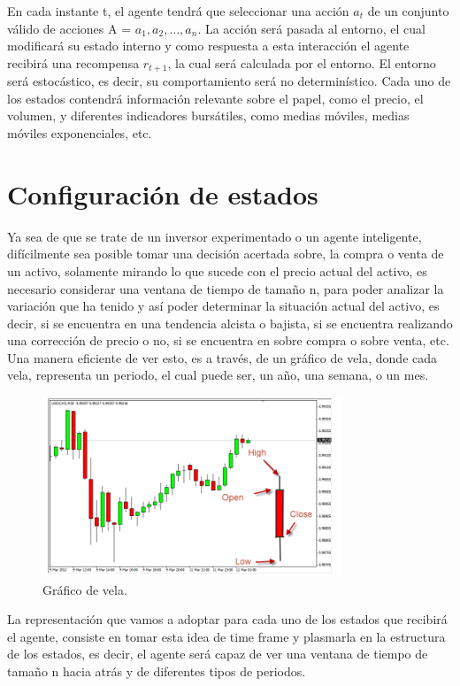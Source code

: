 En cada instante t, el agente tendrá que seleccionar una acción $a_t$  de un conjunto válido de acciones A = {$a_1, a_2, …, a_n$}. La acción será pasada al entorno, el cual modificará su estado interno y como respuesta a esta interacción el agente recibirá una recompensa $r_{t + 1}$, la cual será calculada por el entorno. El entorno será estocástico, es decir, su comportamiento será no determinístico. Cada uno de los estados contendrá información relevante sobre el papel, como el precio, el volumen, y diferentes indicadores bursátiles, como medias móviles, medias móviles exponenciales, etc.

\section{Configuración de estados}

Ya sea de que se trate de un inversor experimentado o un agente inteligente, difícilmente sea posible tomar una decisión acertada sobre, la compra o venta de un activo, solamente mirando lo que sucede con el precio actual 
del activo, es necesario considerar una ventana de tiempo de tamaño n, para poder analizar la variación que ha tenido y así poder determinar la situación actual del activo, es decir, si se encuentra en una tendencia
alcista o bajista, si se encuentra realizando una corrección de precio o no, si se encuentra en sobre compra o sobre venta, etc. Una manera eficiente de ver esto, es a través, de un gráfico de vela, donde cada vela, representa un periodo, el cual puede ser, un año, una semana, o un mes.

\begin{figure}[h!]
	\centering
	\includegraphics[scale=0.75]{imagenes/candleChart.png}
	\caption{Gráfico de vela.}
\end{figure}

La representación que vamos a adoptar para cada uno de los estados que recibirá el agente, consiste en tomar esta idea de time frame y plasmarla en la estructura de los estados, es decir, el agente será capaz de ver una ventana de tiempo de tamaño n hacia atrás y de diferentes tipos de periodos.

